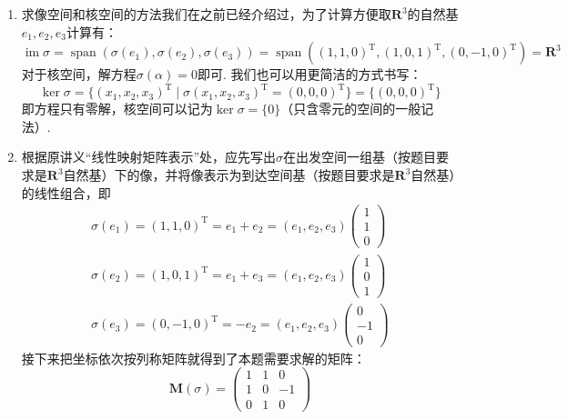 \documentclass[UTF8,12pt,a4paper,fontset=fandol]{ctexart}
\begin{document}
\begin{solve}
\begin{enumerate}
        \item 求像空间和核空间的方法我们在之前已经介绍过，为了计算方便取$\mathbf{R}^3$的自然基$e_1,e_2,e_3$计算有：
              \[
                \operatorname{im}\sigma
                =\operatorname{span}(\sigma(e_1),\sigma(e_2),\sigma(e_3))
                =\operatorname{span}(
                        (1,1,0)^{\mathrm{T}},
                        (1,0,1)^{\mathrm{T}},
                        (0,-1,0)^{\mathrm{T}}
                    )
                =\mathbf{R}^3
              \]
              对于核空间，解方程$\sigma(\alpha)=0$即可. 我们也可以用更简洁的方式书写：
              \[
                \ker\sigma
                =\{
                    (x_1,x_2,x_3)^{\mathrm{T}} \mid
                    \sigma(x_1,x_2,x_3)^{\mathrm{T}}
                    =(0,0,0)^{\mathrm{T}}
                \}
                =\{(0,0,0)^{\mathrm{T}}\}
              \]
              即方程只有零解，核空间可以记为$\ker\sigma=\{0\}$（只含零元的空间的一般记法）.

        \item 根据原讲义“线性映射矩阵表示”处，应先写出$\sigma$在出发空间一组基（按题目要求是$\mathbf{R}^3$自然基）下的像，并将像表示为到达空间基（按题目要求是$\mathbf{R}^3$自然基）的线性组合，即
            \begin{gather*}
                \sigma(e_1) = (1,1,0)^{\mathrm{T}}
                =e_1+e_2=(e_1,e_2,e_3)\begin{pmatrix}
                    1 \\ 1 \\ 0
                \end{pmatrix} \\
                \sigma(e_2) = (1,0,1)^{\mathrm{T}}
                =e_1+e_3=(e_1,e_2,e_3)\begin{pmatrix}
                    1 \\ 0 \\ 1
                \end{pmatrix} \\
                \sigma(e_3) = (0,-1,0)^{\mathrm{T}}
                =-e_2=(e_1,e_2,e_3)\begin{pmatrix}
                    0 \\ -1 \\ 0
                \end{pmatrix}
            \end{gather*}
            接下来把坐标依次按列称矩阵就得到了本题需要求解的矩阵：
            \[
                \mathbf{M}(\sigma)=\begin{pmatrix}
                    1 & 1 & 0  \\
                    1 & 0 & -1 \\
                    0 & 1 & 0
                \end{pmatrix}
            \]
    \end{enumerate}
\end{solve}
\end{document}
